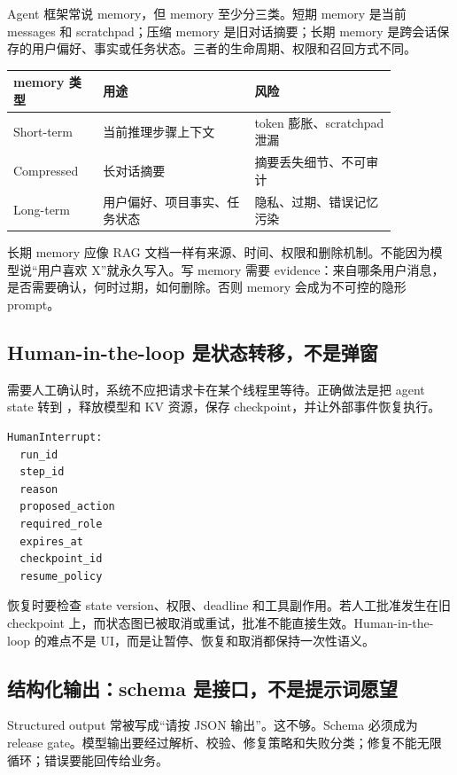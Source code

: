 Agent 框架常说 memory，但 memory 至少分三类。短期 memory 是当前 messages 和 scratchpad；压缩 memory 是旧对话摘要；长期 memory 是跨会话保存的用户偏好、事实或任务状态。三者的生命周期、权限和召回方式不同。

\begin{center}
\small
\begin{tabular}{p{0.20\linewidth}p{0.34\linewidth}p{0.32\linewidth}}
\toprule
memory 类型 & 用途 & 风险 \\
\midrule
Short-term & 当前推理步骤上下文 & token 膨胀、scratchpad 泄漏 \\
Compressed & 长对话摘要 & 摘要丢失细节、不可审计 \\
Long-term & 用户偏好、项目事实、任务状态 & 隐私、过期、错误记忆污染 \\
\bottomrule
\end{tabular}
\end{center}

长期 memory 应像 RAG 文档一样有来源、时间、权限和删除机制。不能因为模型说“用户喜欢 X”就永久写入。写 memory 需要 evidence：来自哪条用户消息，是否需要确认，何时过期，如何删除。否则 memory 会成为不可控的隐形 prompt。

\subsection{Human-in-the-loop 是状态转移，不是弹窗}

需要人工确认时，系统不应把请求卡在某个线程里等待。正确做法是把 agent state 转到 ，释放模型和 KV 资源，保存 checkpoint，并让外部事件恢复执行。

\begin{lstlisting}[numbers=none,caption={HumanInterrupt}]
HumanInterrupt:
  run_id
  step_id
  reason
  proposed_action
  required_role
  expires_at
  checkpoint_id
  resume_policy
\end{lstlisting}

恢复时要检查 state version、权限、deadline 和工具副作用。若人工批准发生在旧 checkpoint 上，而状态图已被取消或重试，批准不能直接生效。Human-in-the-loop 的难点不是 UI，而是让暂停、恢复和取消都保持一次性语义。

\subsection{结构化输出：schema 是接口，不是提示词愿望}

Structured output 常被写成“请按 JSON 输出”。这不够。Schema 必须成为 release gate。模型输出要经过解析、校验、修复策略和失败分类；修复不能无限循环；错误要能回传给业务。

